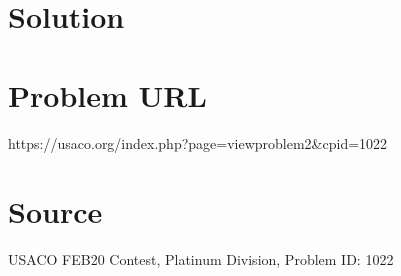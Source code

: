 \documentclass[12pt]{article}
\begin{document}
\section*{Solution}


\section*{Problem URL}
https://usaco.org/index.php?page=viewproblem2&cpid=1022

\section*{Source}
USACO FEB20 Contest, Platinum Division, Problem ID: 1022
\end{document}
